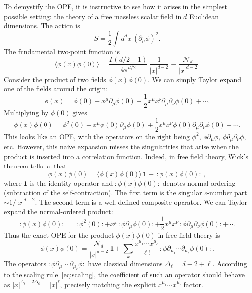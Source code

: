 \documentclass[11pt]{article}
\begin{document}
To demystify the OPE, it is instructive to see how it arises in the simplest possible setting: the theory of a free massless scalar field in $d$ Euclidean dimensions. The action is
\[
S = \frac{1}{2} \int d^d x \, (\partial_\mu \phi)^2 .
\]
The fundamental two-point function is
\begin{equation}
\langle \phi(x) \phi(0) \rangle = \frac{\Gamma(d/2 - 1)}{4 \pi^{d/2}} \, \frac{1}{|x|^{d-2}} \equiv \frac{\mathcal{N}_d}{|x|^{d-2}} .
\label{eq:2pt}
\end{equation}
Consider the product of two fields $\phi(x)\phi(0)$. We can simply Taylor expand one of the fields around the origin:
\[
\phi(x) = \phi(0) + x^\mu \partial_\mu \phi(0) + \frac{1}{2} x^\mu x^\nu \partial_\mu \partial_\nu \phi(0) + \cdots .
\]
Multiplying by $\phi(0)$ gives
\[
\phi(x)\phi(0) = \phi^2(0) + x^\mu \phi(0)\partial_\mu \phi(0) + \frac{1}{2} x^\mu x^\nu \phi(0)\partial_\mu\partial_\nu \phi(0) + \cdots .
\]
This looks like an OPE, with the operators on the right being $\phi^2$, $\phi\partial_\mu\phi$, $\phi\partial_\mu\partial_\nu\phi$, etc. However, this naive expansion misses the singularities that arise when the product is inserted into a correlation function. Indeed, in free field theory, Wick's theorem tells us that
\[
\phi(x)\phi(0) = \langle \phi(x)\phi(0) \rangle \, \mathbf{1} + \, :\phi(x)\phi(0): \, ,
\]
where $\mathbf{1}$ is the identity operator and $:\phi(x)\phi(0):$ denotes normal ordering (subtraction of the self-contraction). The first term is the singular $c$-number part $\sim 1/|x|^{d-2}$. The second term is a well-defined composite operator. We can Taylor expand the normal-ordered product:
\[
:\phi(x)\phi(0): \, = \, :\phi^2(0): + x^\mu \, :\phi\partial_\mu\phi(0): + \frac{1}{2} x^\mu x^\nu \, :\phi\partial_\mu\partial_\nu\phi(0): + \cdots .
\]
Thus the exact OPE for the product $\phi(x)\phi(0)$ in free field theory is
\begin{equation}
\boxed{
\phi(x)\phi(0) = \frac{\mathcal{N}_d}{|x|^{d-2}} \, \mathbf{1} + \sum_{k} \frac{x^{\mu_1} \cdots x^{\mu_\ell}}{\ell!} \, :\phi \partial_{\mu_1}\cdots\partial_{\mu_\ell}\phi(0): .
}
\label{eq:freeOPE}
\end{equation}
The operators $:\phi \partial_{\mu_1}\cdots\partial_{\mu_\ell}\phi:$ have classical dimensions $\Delta_\ell = d - 2 + \ell$. According to the scaling rule~\eqref{eq:scaling}, the coefficient of such an operator should behave as $|x|^{\Delta_\ell - 2\Delta_\phi} = |x|^{\ell}$, precisely matching the explicit $x^{\mu_1}\cdots x^{\mu_\ell}$ factor.
\end{document}
